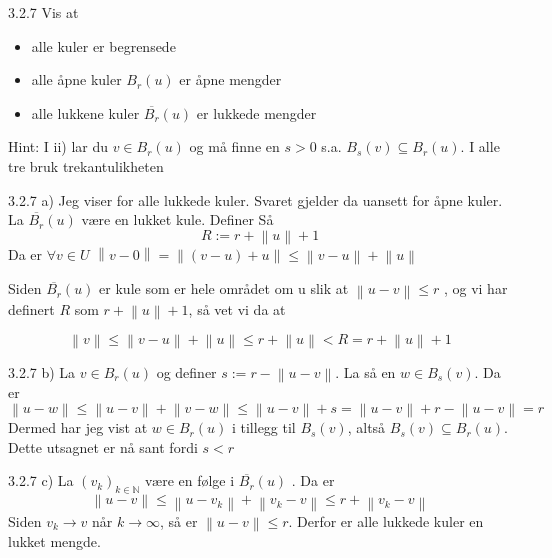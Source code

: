 \documentclass[a4paper,norsk]{article}
\renewcommand{\leq}{\leqslant}
\begin{document}
\begin{oppgavebox}{3.2.7}{}
Vis at
\begin{itemize}
    \item alle kuler er begrensede
    \item alle åpne kuler $ B_r(u) $ er åpne mengder
    \item alle lukkene kuler $ \overline{B_r}(u) $ er lukkede mengder
\end{itemize}

Hint: I ii) lar du $ v \in B_r(u) $ og må finne en $ s>0 $ s.a. $ B_s(v)  \subseteq B_r(u)$. I alle tre bruk trekantulikheten

\begin{proofbox}{3.2.7 a)}{}
Jeg viser for alle lukkede kuler. Svaret gjelder da uansett for åpne kuler. La $ \overline{B_r}(u)  $ være en lukket kule. Definer Så
\[
    R := r + \left\lVert u \right\rVert + 1
\]
Da er $ \forall v \in U $ $ \left\lVert v - 0 \right\rVert = \left\lVert \left( v-u \right) +u  \right\rVert \leq \left\lVert v-u \right\rVert + \left\lVert u \right\rVert   $ 

Siden $ \overline{B_r}(u)  $ er kule som er hele området om u slik at $ \left\lVert u - v \right\rVert \leq r $ , og vi har definert $ R $ som $ r + \left\lVert u \right\rVert +1 $, så vet vi da at 

\[
    \left\lVert v \right\rVert \leq \left\lVert v - u \right\rVert + \left\lVert u \right\rVert \leq r + \left\lVert u \right\rVert < R = r + \left\lVert u \right\rVert + 1
\] 
\end{proofbox}

\begin{proofbox}{3.2.7 b)}{}
La $ v \in  B_r(u) $ og definer $ s := r - \left\lVert u - v \right\rVert  $. La så en $ w \in B_s(v) $. Da er 
\[
    \left\lVert u - w \right\rVert \leq \left\lVert u - v \right\rVert + \left\lVert v - w \right\rVert \leq \left\lVert u - v \right\rVert + s = \left\lVert u - v \right\rVert + r - \left\lVert u-v \right\rVert = r
\]
Dermed har jeg vist at $ w \in B_r(u) $ i tillegg til $ B_s(v) $, altså $ B_s(v) \subseteq B_r(u) $. Dette utsagnet er nå sant fordi $ s < r $ 
\end{proofbox}

\begin{proofbox}{3.2.7 c)}{}
La $ \left( v_k \right) _{k \in \mathbb{N}} $ være en følge i $ \overline{B_r}(u) $ . Da er 
\[
    \left\lVert u - v \right\rVert \leq \left\lVert u - v_k \right\rVert + \left\lVert v_k - v \right\rVert \leq r + \left\lVert v_k - v \right\rVert 
\]
Siden $ v_k \to v $ når $ k \to \infty $, så er $ \left\lVert u - v \right\rVert \leq r $. Derfor er alle lukkede kuler en lukket mengde.
\end{proofbox}
\end{oppgavebox}
\end{document}
